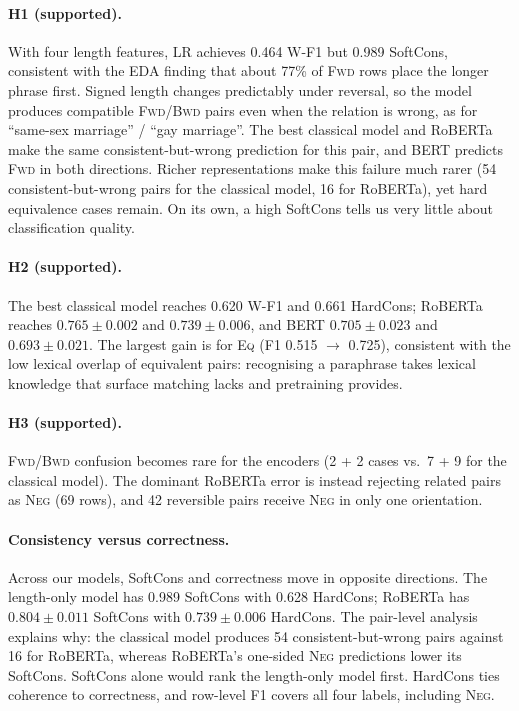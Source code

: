 \documentclass[11pt,a4paper]{article}
\newcommand{\EQ}{\textsc{Eq}}
\newcommand{\FWD}{\textsc{Fwd}}
\newcommand{\BWD}{\textsc{Bwd}}
\newcommand{\NEG}{\textsc{Neg}}
\begin{document}
\paragraph{H1 (supported).} With four length features, LR achieves 0.464 W-F1 but 0.989 SoftCons, consistent with the EDA finding that about 77\% of \FWD{} rows place the longer phrase first. Signed length changes predictably under reversal, so the model produces compatible \FWD/\BWD{} pairs even when the relation is wrong, as for ``same-sex marriage'' / ``gay marriage''. The best classical model and RoBERTa make the same consistent-but-wrong prediction for this pair, and BERT predicts \FWD{} in both directions. Richer representations make this failure much rarer (54 consistent-but-wrong pairs for the classical model, 16 for RoBERTa), yet hard equivalence cases remain. On its own, a high SoftCons tells us very little about classification quality.

\paragraph{H2 (supported).} The best classical model reaches 0.620 W-F1 and 0.661 HardCons; RoBERTa reaches $0.765\pm0.002$ and $0.739\pm0.006$, and BERT $0.705\pm0.023$ and $0.693\pm0.021$. The largest gain is for \EQ{} (F1 0.515 $\rightarrow$ 0.725), consistent with the low lexical overlap of equivalent pairs: recognising a paraphrase takes lexical knowledge that surface matching lacks and pretraining provides.

\paragraph{H3 (supported).} \FWD/\BWD{} confusion becomes rare for the encoders (2 + 2 cases vs.\ 7 + 9 for the classical model). The dominant RoBERTa error is instead rejecting related pairs as \NEG{} (69 rows), and 42 reversible pairs receive \NEG{} in only one orientation.

\paragraph{Consistency versus correctness.} Across our models, SoftCons and correctness move in opposite directions. The length-only model has 0.989 SoftCons with 0.628 HardCons; RoBERTa has $0.804\pm0.011$ SoftCons with $0.739\pm0.006$ HardCons. The pair-level analysis explains why: the classical model produces 54 consistent-but-wrong pairs against 16 for RoBERTa, whereas RoBERTa's one-sided \NEG{} predictions lower its SoftCons. SoftCons alone would rank the length-only model first. HardCons ties coherence to correctness, and row-level F1 covers all four labels, including \NEG.
\end{document}
